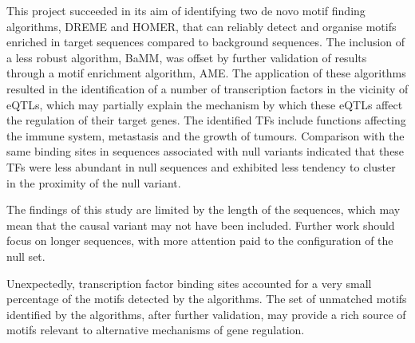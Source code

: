 \documentclass[12pt]{article}
\begin{document}
This project succeeded in its aim of identifying two de novo motif finding algorithms, DREME and HOMER, that can reliably detect and organise motifs enriched in target sequences compared to background sequences. The inclusion of a less robust algorithm, BaMM, was offset by further validation of results through a motif enrichment algorithm, AME. The application of these algorithms resulted in the identification of a number of transcription factors in the vicinity of eQTLs, which may partially explain the mechanism by which these eQTLs affect the regulation of their target genes. The identified TFs include functions affecting the immune system, metastasis and the growth of tumours. Comparison with the same binding sites in sequences associated with null variants indicated that these TFs were less abundant in null sequences and exhibited less tendency to cluster in the proximity of the null variant. 

The findings of this study are limited by the length of the sequences, which may mean that the causal variant may not have been included. Further work should focus on longer sequences, with more attention paid to the configuration of the null set.

Unexpectedly, transcription factor binding sites accounted for a very small percentage of the motifs detected by the algorithms. The set of unmatched motifs identified by the algorithms, after further validation, may provide a rich source of motifs relevant to alternative mechanisms of gene regulation.


\clearpage


\end{document}
